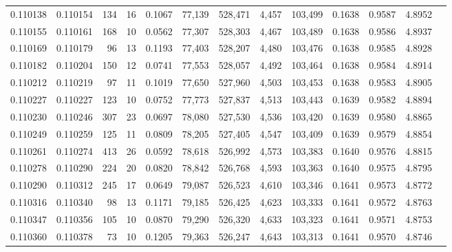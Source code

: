 \begin{tabular}{rrrrrrrrrrrrr}
0.110138 & 0.110154 &   134 &  16 &                                     0.1067 &  77,139 & 528,471 &   4,457 & 103,499 & 0.1638 & 0.9587 & 4.8952 \\
0.110155 & 0.110161 &   168 &  10 &                                     0.0562 &  77,307 & 528,303 &   4,467 & 103,489 & 0.1638 & 0.9586 & 4.8937 \\
0.110169 & 0.110179 &    96 &  13 &                                     0.1193 &  77,403 & 528,207 &   4,480 & 103,476 & 0.1638 & 0.9585 & 4.8928 \\
0.110182 & 0.110204 &   150 &  12 &                                     0.0741 &  77,553 & 528,057 &   4,492 & 103,464 & 0.1638 & 0.9584 & 4.8914 \\
0.110212 & 0.110219 &    97 &  11 &                                     0.1019 &  77,650 & 527,960 &   4,503 & 103,453 & 0.1638 & 0.9583 & 4.8905 \\
0.110227 & 0.110227 &   123 &  10 &                                     0.0752 &  77,773 & 527,837 &   4,513 & 103,443 & 0.1639 & 0.9582 & 4.8894 \\
0.110230 & 0.110246 &   307 &  23 &                                     0.0697 &  78,080 & 527,530 &   4,536 & 103,420 & 0.1639 & 0.9580 & 4.8865 \\
0.110249 & 0.110259 &   125 &  11 &                                     0.0809 &  78,205 & 527,405 &   4,547 & 103,409 & 0.1639 & 0.9579 & 4.8854 \\
0.110261 & 0.110274 &   413 &  26 &                                     0.0592 &  78,618 & 526,992 &   4,573 & 103,383 & 0.1640 & 0.9576 & 4.8815 \\
0.110278 & 0.110290 &   224 &  20 &                                     0.0820 &  78,842 & 526,768 &   4,593 & 103,363 & 0.1640 & 0.9575 & 4.8795 \\
0.110290 & 0.110312 &   245 &  17 &                                     0.0649 &  79,087 & 526,523 &   4,610 & 103,346 & 0.1641 & 0.9573 & 4.8772 \\
0.110316 & 0.110340 &    98 &  13 &                                     0.1171 &  79,185 & 526,425 &   4,623 & 103,333 & 0.1641 & 0.9572 & 4.8763 \\
0.110347 & 0.110356 &   105 &  10 &                                     0.0870 &  79,290 & 526,320 &   4,633 & 103,323 & 0.1641 & 0.9571 & 4.8753 \\
0.110360 & 0.110378 &    73 &  10 &                                     0.1205 &  79,363 & 526,247 &   4,643 & 103,313 & 0.1641 & 0.9570 & 4.8746 \\

\end{tabular}
